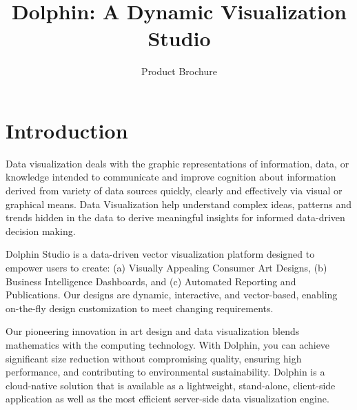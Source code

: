 \documentclass{amm-pst-report}
\title{\textbf{Dolphin: A Dynamic Visualization Studio}}
\author{Product Brochure}
\date{}
\begin{document}
\maketitle
\setlength{\parskip}{10pt}
\pagestyle{fancy}





\section{Introduction}
Data visualization deals with the graphic representations of information, data, or knowledge intended to communicate and improve cognition about information derived from variety of data sources quickly, clearly and effectively via visual or graphical means. Data Visualization help understand complex ideas, patterns and trends hidden in the data to derive meaningful insights for informed data-driven decision making.

Dolphin Studio is a data-driven vector visualization platform designed to empower users to create: (a) Visually Appealing Consumer Art Designs, (b) Business Intelligence Dashboards, and (c) Automated Reporting and Publications. Our designs are dynamic, interactive, and vector-based, enabling on-the-fly design customization to meet changing requirements.

Our pioneering innovation in art design and data visualization blends mathematics with the computing technology. With Dolphin, you can achieve significant size reduction without compromising quality, ensuring high performance, and contributing to environmental sustainability. Dolphin is a cloud-native solution that is available as a lightweight, stand-alone, client-side application as well as the most efficient server-side data visualization engine.
\end{document}
